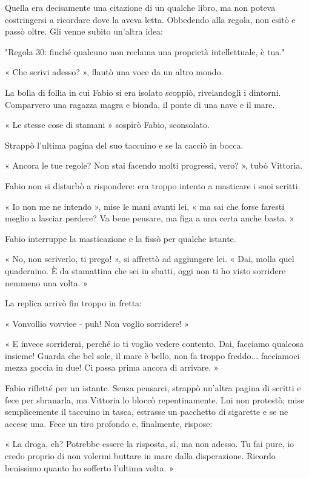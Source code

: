 Quella era decisamente una citazione di un qualche libro, ma non poteva costringersi a ricordare dove la aveva letta. Obbedendo alla regola, non esitò e passò oltre. Gli venne subito un'altra idea:

"Regola 30: finché qualcuno non reclama una proprietà intellettuale, è tua."

« Che scrivi adesso? », flautò una voce da un altro mondo.

La bolla di follia in cui Fabio si era isolato scoppiò, rivelandogli i dintorni. Comparvero una ragazza magra e bionda, il ponte di una nave e il mare.

« Le stesse cose di stamani » sospirò Fabio, sconsolato.

Strappò l'ultima pagina del suo taccuino e se la cacciò in bocca.

« Ancora le tue regole? Non stai facendo molti progressi, vero? », tubò Vittoria.

Fabio non si disturbò a rispondere: era troppo intento a masticare i suoi scritti.

« Io non me ne intendo », mise le mani avanti lei, « ma sai che forse faresti meglio a lasciar perdere? Va bene pensare, ma figa a una certa anche basta. »

Fabio interruppe la masticazione e la fissò per qualche istante.

« No, non scriverlo, ti prego! », si affrettò ad aggiungere lei. « Dai, molla quel quadernino. È da stamattina che sei in sbatti, oggi non ti ho visto sorridere nemmeno una volta. »

La replica arrivò fin troppo in fretta:

« Vonvollio vovviee - puh! Non voglio sorridere! »

« E invece sorriderai, perché io ti voglio vedere contento. Dai, facciamo qualcosa insieme! Guarda che bel sole, il mare è bello, non fa troppo freddo... facciamoci mezza goccia in due! Ci passa prima ancora di arrivare. »

Fabio rifletté per un istante. Senza pensarci, strappò un'altra pagina di scritti e fece per sbranarla, ma Vittoria lo bloccò repentinamente. Lui non protestò; mise semplicemente il taccuino in tasca, estrasse un pacchetto di sigarette e se ne accese una. Fece un tiro profondo e, finalmente, rispose:

« La droga, eh? Potrebbe essere la risposta, sì, ma non adesso. Tu fai pure, io credo proprio di non volermi buttare in mare dalla disperazione. Ricordo benissimo quanto ho sofferto l'ultima volta. »

